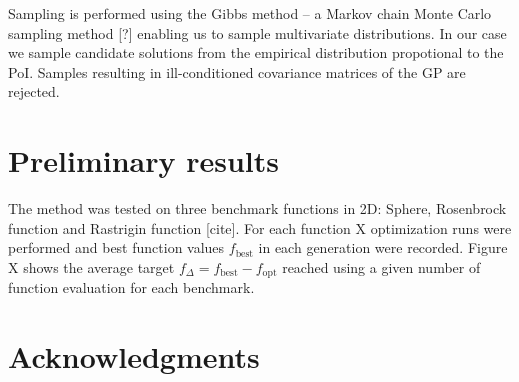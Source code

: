 \documentclass{sig-alternate}
\begin{document}
Sampling is performed using the Gibbs method -- a Markov chain Monte Carlo sampling method [?] 
enabling us to sample multivariate distributions. In our case we sample candidate solutions from 
the empirical distribution propotional to the PoI. Samples resulting in ill-conditioned covariance 
matrices of the GP are rejected.

\section{Preliminary results}

The method was tested on three benchmark functions in 2D: Sphere, Rosenbrock function and Rastrigin function [cite]. For
each function X optimization runs were performed and best function values $f_{\text{best}}$ in each generation
were recorded. Figure X shows the average target $f_{\Delta} = f_{\text{best}} - f_{\text{opt}}$ reached using
a given number of function evaluation for each benchmark.





\section{Acknowledgments}


%

%
%
\end{document}
